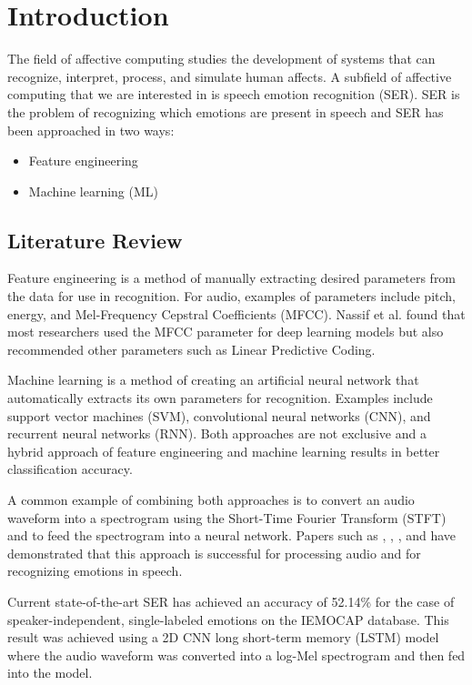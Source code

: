 \section{Introduction}

The field of affective computing studies the development of systems that can recognize, interpret, process, and simulate human affects. A subfield of affective computing that we are interested in is speech emotion recognition (SER). SER is the problem of recognizing which emotions are present in speech and SER has been approached in two ways:
\begin{itemize}
	\item Feature engineering
	\item Machine learning (ML)
\end{itemize}

\subsection{Literature Review}

Feature engineering is a method of manually extracting desired parameters from the data for use in  recognition. For audio, examples of parameters include pitch, energy, and Mel-Frequency Cepstral Coefficients (MFCC).\cite{Rybka2013} Nassif et al. \cite{Nassif2019} found that most researchers used the MFCC parameter for deep learning models but also recommended other parameters such as Linear Predictive Coding. 

Machine learning is a method of creating an artificial neural network that automatically extracts its own parameters for recognition. Examples include support vector machines (SVM), convolutional neural networks (CNN), and recurrent neural networks (RNN). Both approaches are not exclusive and a hybrid approach of feature engineering and machine learning results in better classification accuracy.\cite{Nassif2019}

A common example of combining both approaches is to convert an audio waveform into a spectrogram using the Short-Time Fourier Transform (STFT) and to feed the spectrogram into a neural network. Papers such as \cite{Engel2019}, \cite{Chen2018}, \cite{Badshah2019}, and \cite{Zhao2019} have demonstrated that this approach is successful for processing audio and for recognizing emotions in speech.

Current state-of-the-art SER has achieved an accuracy of 52.14\% for the case of speaker-independent, single-labeled emotions on the IEMOCAP database.\cite{Zhao2019} This result was achieved using a 2D CNN long short-term memory (LSTM) model where the audio waveform was converted into a log-Mel spectrogram and then fed into the model.

